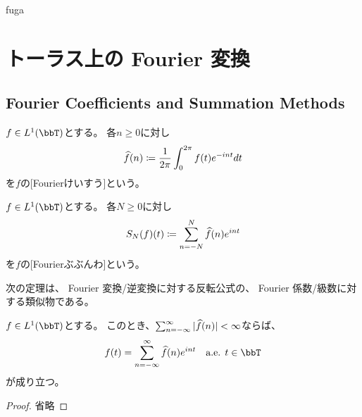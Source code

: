 \documentclass[report]{jlreq}
\begin{document}
fuga

%
\chapter{トーラス上の Fourier 変換}

%
\section{Fourier Coefficients and Summation Methods}

\begin{definition}[Fourier 係数]
    $f \in L^1(\bbT)$とする。
    各$n \ge 0$に対し
    \begin{equation}
        \widehat{f}(n) \coloneqq \frac{1}{2\pi}
            \int_0^{2\pi} f(t) e^{-int} dt
    \end{equation}
    を$f$の[Fourierけいすう]という。
\end{definition}

\begin{definition}
    $f \in L^1(\bbT)$とする。
    各$N \ge 0$に対し
    \begin{equation}
        S_N(f)(t) \coloneqq \sum_{n=-N}^N \widehat{f}(n) e^{int}
    \end{equation}
    を$f$の[Fourierぶぶんわ]という。
\end{definition}

次の定理は、
Fourier 変換/逆変換に対する反転公式の、
Fourier 係数/級数に対する類似物である。

\begin{theorem}
    $f \in L^1(\bbT)$とする。
    このとき、$\sum_{n = -\infty}^{\infty} |\widehat{f}(n)| < \infty$ならば、
    \begin{equation}
        f(t) = \sum_{n = -\infty}^{\infty} \what{f}(n) e^{int}
            \quad \text{a.e. } t \in \bbT
    \end{equation}
    が成り立つ。
\end{theorem}

\begin{proof}
    省略
\end{proof}

%
\end{document}
